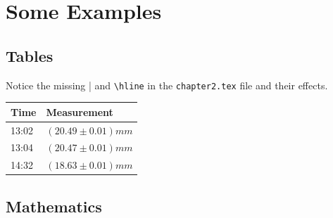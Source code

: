 \section{Some Examples}

\subsection{Tables}

Notice the missing | and \verb|\hline| in the \verb|chapter2.tex| file and their effects.

\begin{table}[H]
    \begin{tabular}[b]{ || l | l  }
        \hline %
        \textbf{Time} & \textbf{Measurement} \\\hline
        13:02 & $(20.49 \pm 0.01)\si{mm}$ \\\hline
        13:04 & $(20.47 \pm 0.01)\si{mm}$ \\%
        14:32 & $(18.63 \pm 0.01)\si{mm}$ \\\hline
    \end{tabular}
\end{table}

\subsection{Mathematics}

